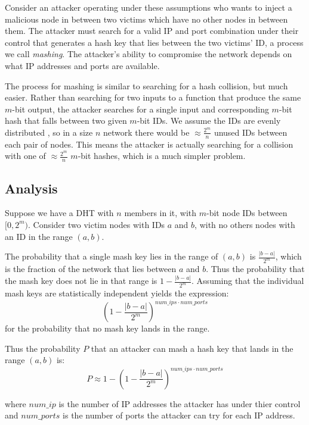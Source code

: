 Consider an attacker operating under these assumptions who wants to inject a malicious node in between two victims which have no other nodes in between them.
The attacker must search for a valid IP and port combination under their control that generates a hash key that lies between the two victims' ID, a process we call \textit{mashing}.
The attacker's ability to compromise the network depends on what IP addresses and ports are available.

The process for mashing is similar to searching for a hash collision, but much easier.
Rather than searching for two inputs to a function that produce the same $m$-bit output, the attacker searches for a single input and corresponding $m$-bit hash that falls between two given $m$-bit IDs.
We assume the IDs are evenly distributed \cite{bellare2004hash}, so in a size $n$ network there would be $\approx \frac{2^{m}}{n}$ unused IDs between each pair of nodes.
This means the attacker is actually searching for a collision with one of $\approx \frac{2^{m}}{n}$ $m$-bit hashes, which is a much simpler problem.

\subsection{Analysis}


Suppose we have a DHT with $n$ members in it, with $m$-bit node IDs between $[0,2^{m})$. 
Consider two victim nodes with IDs $a$ and $b$, with no others nodes with an ID in the range $(a,b)$.

The probability that a single mash key lies in the range of $(a,b)$ is $\frac{|b-a|}{2^{m}}$, which is the fraction of the network that lies between $ a $ and $ b $.
Thus the probability that the mash key does not lie in that range is $1-\frac{|b-a|}{2^{m}}$. 
Assuming that the individual mash keys are statistically independent yields the expression: $$(1-\frac{|b-a|}{2^{m}})^{num\_ips \cdot num\_ports} $$ for the probability that no mash key lands in the range.

Thus the probability $P$ that an attacker can mash a hash key that lands in the range $(a,b)$ is:
$$ P \approx 1 - (1 - \frac{|b-a|}{2^{m}})^{num\_ips \cdot num\_ports  } $$

where $num\_ip$ is the number of IP addresses the attacker has under thier control and $num\_ports$ is the number of ports the attacker can try for each IP address.


